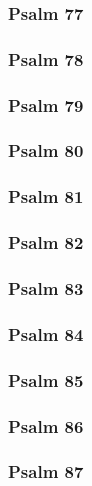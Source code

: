 \documentclass[12pt]{extarticle}
\begin{document}
\begin{multicols}{2}
\subsubsection{Psalm 77}

\newpage

\subsubsection{Psalm 78}

\newpage

\subsubsection{Psalm 79}

\newpage

\subsubsection{Psalm 80}

\newpage

\subsubsection{Psalm 81}

\newpage

\subsubsection{Psalm 82}

\newpage

\subsubsection{Psalm 83}

\newpage

\subsubsection{Psalm 84}

\newpage

\subsubsection{Psalm 85}

\newpage

\subsubsection{Psalm 86}

\newpage

\subsubsection{Psalm 87}

\newpage


\end{multicols}
\end{document}
